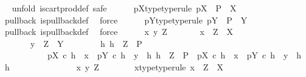 \begin{isabellebody}
\ \ \isamarkupfalse%
{\isacharparenleft}{\kern0pt}unfold\ is{\isacharunderscore}{\kern0pt}cart{\isacharunderscore}{\kern0pt}prod{\isacharunderscore}{\kern0pt}def{\isacharcomma}{\kern0pt}\ safe{\isacharparenright}{\kern0pt}\isanewline
\ \ \ \ \isamarkupfalse%
\ pX{\isacharunderscore}{\kern0pt}type{\isacharbrackleft}{\kern0pt}type{\isacharunderscore}{\kern0pt}rule{\isacharbrackright}{\kern0pt}{\isacharcolon}{\kern0pt}\ {\isachardoublequoteopen}pX\ {\isacharcolon}{\kern0pt}\ P\ {\isasymrightarrow}\ X{\isachardoublequoteclose}\isanewline
\ \ \ \ \ \ \isamarkupfalse%
\ pullback\ is{\isacharunderscore}{\kern0pt}pullback{\isacharunderscore}{\kern0pt}def\ \isamarkupfalse%
\ force\isanewline
\ \ \ \ \isamarkupfalse%
\ pY{\isacharunderscore}{\kern0pt}type{\isacharbrackleft}{\kern0pt}type{\isacharunderscore}{\kern0pt}rule{\isacharbrackright}{\kern0pt}{\isacharcolon}{\kern0pt}\ {\isachardoublequoteopen}pY\ {\isacharcolon}{\kern0pt}\ P\ {\isasymrightarrow}\ Y{\isachardoublequoteclose}\isanewline
\ \ \ \ \ \ \isamarkupfalse%
\ pullback\ is{\isacharunderscore}{\kern0pt}pullback{\isacharunderscore}{\kern0pt}def\ \isamarkupfalse%
\ force\isanewline
\ \ \ \ \isamarkupfalse%
\ {\isachardoublequoteopen}{\isasymAnd}x\ y\ Z{\isachardot}{\kern0pt}\isanewline
\ \ \ \ \ \ \ x\ {\isacharcolon}{\kern0pt}\ Z\ {\isasymrightarrow}\ X\ {\isasymLongrightarrow}\isanewline
\ \ \ \ \ \ \ y\ {\isacharcolon}{\kern0pt}\ Z\ {\isasymrightarrow}\ Y\ {\isasymLongrightarrow}\isanewline
\ \ \ \ \ \ \ {\isasymexists}h{\isachardot}{\kern0pt}\ h\ {\isacharcolon}{\kern0pt}\ Z\ {\isasymrightarrow}\ P\ {\isasymand}\isanewline
\ \ \ \ \ \ \ \ \ \ \ pX\ {\isasymcirc}\isactrlsub c\ h\ {\isacharequal}{\kern0pt}\ x\ {\isasymand}\ pY\ {\isasymcirc}\isactrlsub c\ h\ {\isacharequal}{\kern0pt}\ y\ {\isasymand}\ {\isacharparenleft}{\kern0pt}{\isasymforall}h{}{\isachardot}{\kern0pt}\ h{}\ {\isacharcolon}{\kern0pt}\ Z\ {\isasymrightarrow}\ P\ {\isasymand}\ pX\ {\isasymcirc}\isactrlsub c\ h{}\ {\isacharequal}{\kern0pt}\ x\ {\isasymand}\ pY\ {\isasymcirc}\isactrlsub c\ h{}\ {\isacharequal}{\kern0pt}\ y\ {\isasymlongrightarrow}\ h{}\ {\isacharequal}{\kern0pt}\ h{\isacharparenright}{\kern0pt}{\isachardoublequoteclose}\isanewline
\ \ \ \ \isamarkupfalse%
\ {\isacharminus}{\kern0pt}\ \isanewline
\ \ \ \ \ \ \isamarkupfalse%
\ x\ y\ Z\isanewline
\ \ \ \ \ \ \isamarkupfalse%
\ x{\isacharunderscore}{\kern0pt}type{\isacharbrackleft}{\kern0pt}type{\isacharunderscore}{\kern0pt}rule{\isacharbrackright}{\kern0pt}{\isacharcolon}{\kern0pt}\ {\isachardoublequoteopen}x\ {\isacharcolon}{\kern0pt}\ Z\ {\isasymrightarrow}\ X{\isachardoublequoteclose}\isanewline

\end{isabellebody}
